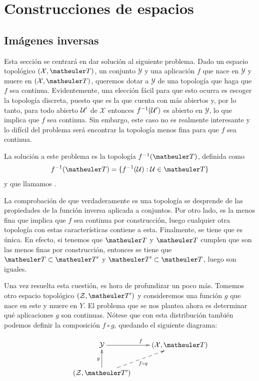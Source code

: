\chapter{Construcciones de espacios}
\label{const}

\section{Imágenes inversas}

Esta sección se centrará en dar solución al siguiente problema. Dado un espacio topológico $(\mathcal{X},\T)$, un conjunto $\mathcal{Y}$ y una aplicación $f$ que nace en $\mathcal{Y}$ y muere en $(\mathcal{X},\T)$, queremos dotar a $\mathcal{Y}$ de una topología que haga que $f$ sea continua. Evidentemente, una elección fácil para que esto ocurra es escoger la topología discreta, puesto que es la que cuenta con más abiertos y, por lo tanto, para todo abierto $\mathcal{U}'$ de $\mathcal{X}$ entonces $f^{-1}(\mathcal{U}')$ es abierto en $\mathcal{Y}$, lo que implica que $f$ sea continua. Sin embargo, este caso no es realmente interesante y lo difícil del problema será encontrar la topología menos fina para que $f$ sea continua.

La solución a este problema es la topología $f^{-1}(\T)$, definida como 
\[f^{-1}(\T)=\{f^{-1}(\U):\U\in \T\}\]
y que llamamos .

La comprobación de que verdaderamente es una topología se desprende de las propiedades de la función inversa aplicada a conjuntos. Por otro lado, es la menos fina que implica que $f$ sea continua por construcción, luego cualquier otra topología con estas características contiene a esta. Finalmente, se tiene que es única. En efecto, si tenemos que $\T$ y $\T$ cumplen que son las menos finas por construcción, entonces se tiene que $\T\subset \T'$ y $\T'\subset \T$, luego son iguales.

Una vez resuelta esta cuestión, es hora de profundizar un poco más. Tomemos otro espacio topológico $(\mathcal{Z},\T')$ y consideremos una función $g$ que nace en este y muere en $Y$. El problema que se nos plantea ahora es determinar qué aplicaciones $g$ son continuas. Nótese que con esta distribución también podemos definir la composición $f\circ g$, quedando el siguiente diagrama:

\begin{equation*}
\xymatrix{
	&\mathcal{Y} \ar[r]^f
	&(\mathcal{X},\T) \\
	&(\mathcal{Z},\T') \ar@{-->}[ru]_{f\circ g} \ar[u]^g}
\end{equation*}

